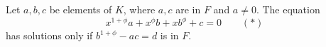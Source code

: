 Let $a, b, c$ be elements of $K$, where $a, c$ are in $F$ and $a \neq 0$. The equation
$$x^{1+\phi}a + x^{\phi}b + xb^{\phi} + c = 0 \qquad (*)$$
has solutions only if $b^{1+\phi} - ac = d$ is in $F$.
